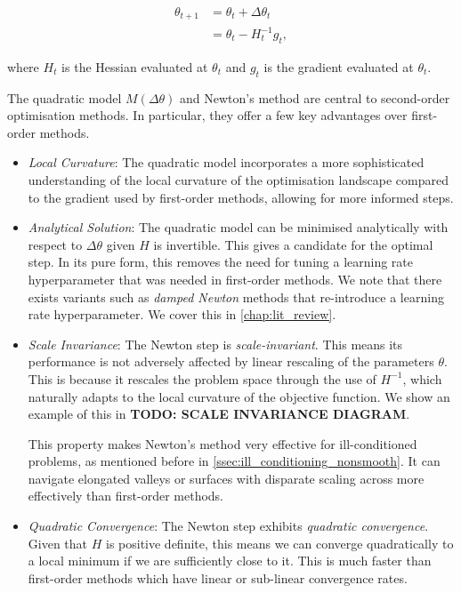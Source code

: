\begin{align}

    \theta_{t+1} &= \theta_t + \Delta \theta_t \\

    &= \theta_t - H_t^{-1} g_t,

\end{align}

where $H_t$ is the Hessian evaluated at $\theta_t$ and $g_t$ is the gradient evaluated at $\theta_t$.




The quadratic model $M(\Delta \theta)$ and Newton's method are central to second-order optimisation methods. In particular, they offer a few key advantages over first-order methods. 

\begin{itemize}

    \item \textit{Local Curvature}: The quadratic model incorporates a more sophisticated understanding of the local curvature of the optimisation landscape compared to the gradient used by first-order methods, allowing for more informed steps.

    \item \textit{Analytical Solution}: The quadratic model can be minimised analytically with respect to $\Delta \theta$ given $H$ is invertible. This gives a candidate for the optimal step. In its pure form, this removes the need for tuning a learning rate hyperparameter that was needed in first-order methods. We note that there exists variants such as \textit{damped Newton} methods that re-introduce a learning rate hyperparameter. We cover this in \cref{chap:lit_review}.

    \item \textit{Scale Invariance}: The Newton step is \textit{scale-invariant}. This means its performance is not adversely affected by linear rescaling of the parameters $\theta$. This is because it rescales the problem space through the use of $H^{-1}$, which naturally adapts to the local curvature of the objective function. We show an example of this in \textbf{TODO: SCALE INVARIANCE DIAGRAM}.

    This property makes Newton's method very effective for ill-conditioned problems, as mentioned before in \cref{ssec:ill_conditioning_nonsmooth}. It can navigate elongated valleys or surfaces with disparate scaling across more effectively than first-order methods.

    \item \textit{Quadratic Convergence}: The Newton step exhibits \textit{quadratic convergence}. Given that $H$ is positive definite, this means we can converge quadratically to a local minimum if we are sufficiently close to it. This is much faster than first-order methods which have linear or sub-linear convergence rates.

\end{itemize}



